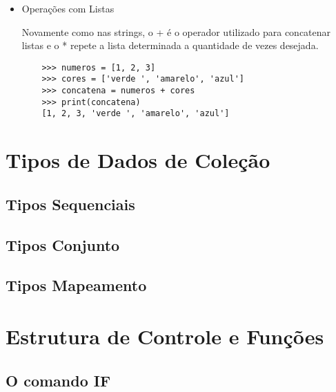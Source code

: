 	\begin{itemize}
	\item {Operações com Listas}
	
	Novamente como nas strings, o + é o operador utilizado para concatenar listas e o * repete a lista determinada a quantidade de vezes desejada.
	
	\begin{lstlisting}
	>>> numeros = [1, 2, 3]
	>>> cores = ['verde ', 'amarelo', 'azul']
	>>> concatena = numeros + cores
	>>> print(concatena)
	[1, 2, 3, 'verde ', 'amarelo', 'azul']
	\end{lstlisting}

	\end{itemize}
    \section{Tipos de Dados de Coleção}


            \subsection{Tipos Sequenciais}


            \subsection{Tipos Conjunto}


            \subsection{Tipos Mapeamento}




    \section{Estrutura de Controle e Funções}

            \subsection{O comando IF}


